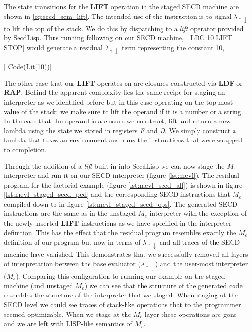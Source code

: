 \documentclass[a4paper,12pt,twoside,openright]{report}
\theoremstyle{definition}
\newcommand{\mslang}{$\lambda_{\uparrow\downarrow}$}
\newcommand{\mevl}{$M_{e}$}
\newcommand{\secdlisp}{SecdLisp}
\begin{document}
The state transitions for the \textbf{LIFT} operation in the staged SECD machine are shown in \eqref{eq:secd_sem_lift}. The intended use of the instruction is to signal \mslang{} to lift the top of the stack. We do this by dispatching to a \textit{lift} operator provided by \secdlisp. Thus running following on our SECD machine, |   LDC 10 LIFT STOP| would generate a residual \mslang{} term representing the constant 10,

|    Code(Lit(10))|

The other case that our \textbf{LIFT} operates on are closures constructed via \textbf{LDF} or \textbf{RAP}. Behind the apparent complexity lies the same recipe for staging an interpreter as we identified before but in this case operating on the top most value of the stack: we make sure to lift the operand if it is a number or a string. In the case that the operand is a closure we construct, lift and return a new lambda using the state we stored in registers \textit{F} and \textit{D}. We simply construct a lambda that takes an environment and runs the instructions that were wrapped to completion.

Through the addition of a \textit{lift} built-in into \secdlisp{} we can now stage the \mevl{} interpreter and run it on our SECD interpreter (figure \ref{lst:mevl}). The residual program for the factorial example (figure \ref{lst:mevl_secd_all}) is shown in figure \ref{lst:mevl_staged_secd_ped} and the corresponding SECD instructions that \mevl{} compiled down to in figure \ref{lst:mevl_staged_secd_ops}. The generated SECD instructions are the same as in the unstaged \mevl{} interpreter with the exception of the newly inserted \textbf{LIFT} instructions as we have specified in the interpreter definition. This has the effect that the residual program resembles exactly the \mevl{} definition of our program but now in terms of \mslang{} and all traces of the SECD machine have vanished. This demonstrates that we successfully removed all layers of interpretation between the base evaluator (\mslang{}) and the user-most interpreter (\mevl{}). Comparing this configuration to running our example on the staged machine (and unstaged \mevl{}) we can see that the structure of the generated code resembles the structure of the interpreter that we staged. When staging at the SECD level we could see traces of stack-like operations that to the programmer seemed optimizable. When we stage at the \mevl{} layer these operations are gone and we are left with LISP-like semantics of \mevl{}.
\end{document}
